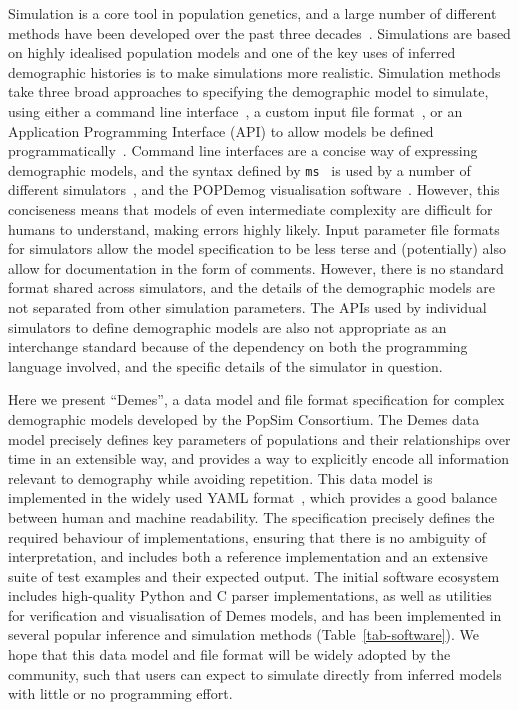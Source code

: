 \documentclass[11pt]{article}
\newcommand{\ms}[0]{\texttt{ms}}
\begin{document}
Simulation is a core tool in population genetics, and a
large number of different methods have been developed
over the past three decades~\citep{carvajal2008simulation,liu2008survey,
arenas2012simulation,yuan2012overview,hoban2012computer}.
Simulations are based on highly idealised population models
and one of the key uses of inferred demographic histories
is to make simulations more realistic.
Simulation methods take three broad approaches to specifying
the demographic model to simulate,
using either a command line
interface~\citep[e.g.][]{hudson2002generating,kern2016discoal},
a custom input file
format~\citep[e.g.][]{guillaume2006nemo,excoffier2011fastsimcoal,shlyakhter2014cosi2},
or an Application Programming Interface (API) to allow
models be defined programmatically~\citep[e.g.][]{
thornton2014cpp,kelleher2016efficient,becheler2019quetzal,haller2019slim}.
Command line interfaces are a concise way of expressing
demographic models, and the syntax defined by \ms~\citep{hudson2002generating}
is used by a number of different
simulators~\citep[e.g.][]{ewing2010msms,chen2009fast,staab2015scrm},
and the POPDemog visualisation software~\citep{zhou2018popdemog}.
However, this conciseness means that models of even intermediate complexity
are difficult for humans to understand, making errors highly likely.
Input parameter file formats for simulators allow the model specification
to be less terse and (potentially) also allow for documentation in the
form of comments. However, there is no standard format shared across
simulators, and the details of the demographic models are not separated
from other simulation parameters. The APIs used by individual simulators
to define demographic models are also not appropriate as an interchange
standard because of the dependency on both the programming language involved,
and the specific details of the simulator in question.

Here we present ``Demes'', a data model and file format specification for
complex demographic models developed by the PopSim Consortium. The Demes data
model precisely defines key parameters of populations and their relationships
over time in an extensible way, and provides a way to explicitly encode all
information relevant to demography while avoiding repetition. This data model
is implemented in the widely used YAML format~\citep{ben2009yaml}, which
provides a good balance between human and machine readability. The
specification precisely defines the required behaviour of implementations,
ensuring that there is no ambiguity of interpretation, and includes both a
reference implementation and an extensive suite of test examples and their
expected output. The initial software ecosystem includes high-quality Python
and C parser implementations, as well as utilities for verification and
visualisation of Demes models, and has been implemented in several popular
inference and simulation methods (Table~\ref{tab-software}).  We hope that this
data model and file format will be widely adopted by the community, such that
users can expect to simulate directly from inferred models with little or no
programming effort.
\end{document}
